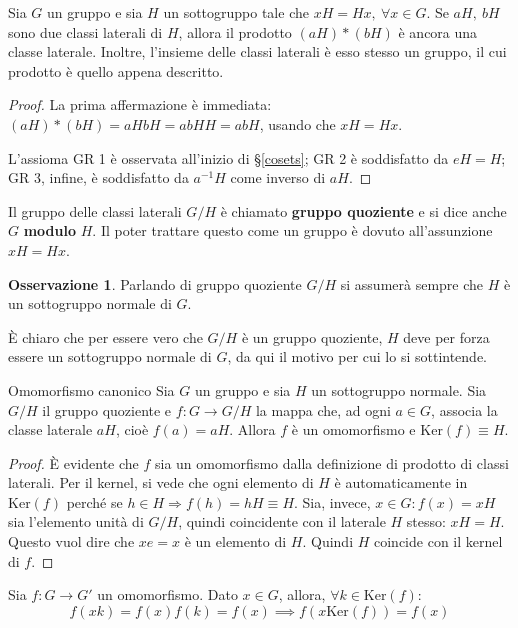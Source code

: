 \documentclass[11pt, a4paper]{scrartcl}
\theoremstyle{definition}
\numberwithin{esempio}{section}
\theoremstyle{definition}
\newtheorem{obs}{Osservazione}
\numberwithin{obs}{section}
\numberwithin{nota}{section}
\numberwithin{equation}{subsection}
\begin{document}
\begin{teorema}
	{}{}
	Sia $G$ un gruppo e sia $H$ un sottogruppo tale che $xH = Hx, \ \forall x \in G$. Se $aH, \ bH$ sono due classi laterali di $H$, allora il prodotto $(aH) * (bH) $ \`e ancora una classe laterale. Inoltre, l'insieme delle classi laterali \`e esso stesso un gruppo, il cui prodotto \`e quello appena descritto.

	\begin{proof}
		La prima affermazione \`e immediata: $(aH) * (bH) = aHbH = abHH = abH$, usando che $xH = Hx$.

		L'assioma GR 1 \`e osservata all'inizio di \S \ref{cosets}; GR 2 \`e soddisfatto da $eH = H$; GR 3, infine, \`e soddisfatto da $a^{-1 } H$ come inverso di $aH$.
	\end{proof}
\end{teorema}
\noindent Il gruppo delle classi laterali $G / H$ \`e chiamato \textbf{gruppo quoziente} e si dice anche $G$ \textbf{modulo} $H$. 
Il poter trattare questo come un gruppo \`e dovuto all'assunzione $xH = Hx$.
\begin{obs}
	Parlando di gruppo quoziente $G / H$ si assumer\`a sempre che $H$ \`e un sottogruppo normale di $G$.

	\`E chiaro che per essere vero che $G / H$ \`e un gruppo quoziente, $H$ deve per forza essere un sottogruppo normale di $G$, da qui il motivo per cui lo si sottintende.
\end{obs}
\begin{corollario}
	{Omomorfismo canonico}{}
	Sia $G$ un gruppo e sia $H$ un sottogruppo normale. Sia $G / H$ il gruppo quoziente e $f:G\to G /H$ la mappa che, ad ogni $a\in G$, associa la classe laterale $aH$, cio\`e $f(a) = aH$. Allora $f$ \`e un omomorfismo e $\mathrm{Ker} (f) \equiv H$.
	\begin{proof}
	\`E evidente che $f$ sia un omomorfismo dalla definizione di prodotto di classi laterali.
	Per il kernel, si vede che ogni elemento di $H$ \`e automaticamente in $\mathrm{Ker} (f)$ perch\'e se $h \in H \Rightarrow  f(h) = hH \equiv H$.
Sia, invece, $x \in G:f(x) = xH $ sia l'elemento unit\`a di $G/H$, quindi coincidente con il laterale $H$ stesso: $xH = H$.
Questo vuol dire che $xe = x$ \`e un elemento di $H$. Quindi $H$ coincide con il kernel di $f$.
	\end{proof}
\end{corollario}
Sia $f:G\to G'$ un omomorfismo. Dato $x \in G$, allora, $\forall k \in \mathrm{Ker} (f)$:
\[
	f(xk) = f(x) f(k) = f(x) \implies f(x\mathrm{Ker} (f)) = f(x)
\] 
\end{document}
